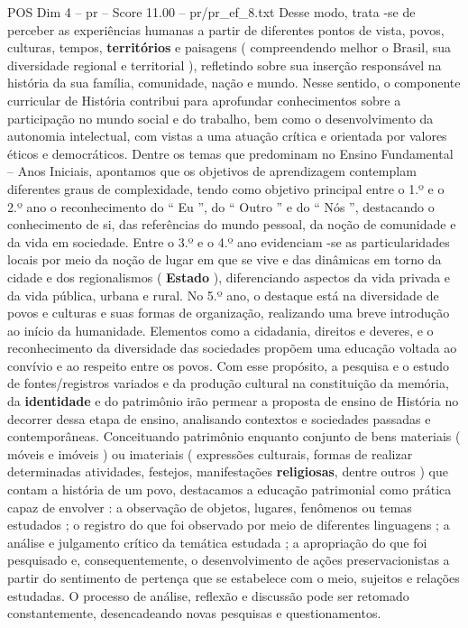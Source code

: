 \begin{textsample}{POS Dim 4 – pr – Score 11.00 – pr/pr\_ef\_8.txt}
Desse modo, trata -se de perceber as experiências humanas a partir de diferentes pontos de vista, povos, culturas, tempos, \textbf{territórios} e paisagens ( compreendendo melhor o Brasil, sua diversidade regional e territorial ), refletindo sobre sua inserção responsável na história da sua família, comunidade, nação e mundo.
Nesse sentido, o componente curricular de História contribui para aprofundar conhecimentos sobre a participação no mundo social e do trabalho, bem como o desenvolvimento da autonomia intelectual, com vistas a uma atuação crítica e orientada por valores éticos e democráticos.
Dentre os temas que predominam no Ensino Fundamental – Anos Iniciais, apontamos que os objetivos de aprendizagem contemplam diferentes graus de complexidade, tendo como objetivo principal entre o 1.º e o 2.º ano o reconhecimento do “ Eu ”, do “ Outro ” e do “ Nós ”, destacando o conhecimento de si, das referências do mundo pessoal, da noção de comunidade e da vida em sociedade.
Entre o 3.º e o 4.º ano evidenciam -se as particularidades locais por meio da noção de lugar em que se vive e das dinâmicas em torno da cidade e dos regionalismos ( \textbf{Estado} ), diferenciando aspectos da vida privada e da vida pública, urbana e rural.
No 5.º ano, o destaque está na diversidade de povos e culturas e suas formas de organização, realizando uma breve introdução ao início da humanidade.
Elementos como a cidadania, direitos e deveres, e o reconhecimento da diversidade das sociedades propõem uma educação voltada ao convívio e ao respeito entre os povos.
Com esse propósito, a pesquisa e o estudo de fontes/registros variados e da produção cultural na constituição da memória, da \textbf{identidade} e do patrimônio irão permear a proposta de ensino de História no decorrer dessa etapa de ensino, analisando contextos e sociedades passadas e contemporâneas.
Conceituando patrimônio enquanto conjunto de bens materiais ( móveis e imóveis ) ou imateriais ( expressões culturais, formas de realizar determinadas atividades, festejos, manifestações \textbf{religiosas}, dentre outros ) que contam a história de um povo, destacamos a educação patrimonial como prática capaz de envolver : a observação de objetos, lugares, fenômenos ou temas estudados ; o registro do que foi observado por meio de diferentes linguagens ; a análise e julgamento crítico da temática estudada ; a apropriação do que foi pesquisado e, consequentemente, o desenvolvimento de ações preservacionistas a partir do sentimento de pertença que se estabelece com o meio, sujeitos e relações estudadas.
O processo de análise, reflexão e discussão pode ser retomado constantemente, desencadeando novas pesquisas e questionamentos.

\end{textsample}
